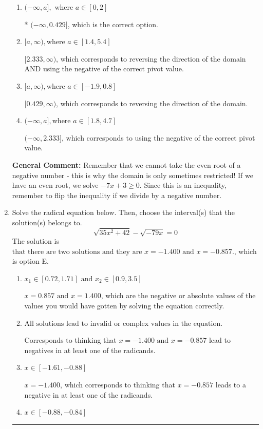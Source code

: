 \documentclass{extbook}[14pt]
\newcommand{\litem}[1]{\item #1

\rule{\textwidth}{0.4pt}}
\begin{document}
\begin{enumerate}
{\begin{enumerate}[label=\Alph*.]
This corresponds to the radical having an odd power, but the radical for this question is even.
\item \( (-\infty, a], \text{ where } a \in [0, 2] \)

* $(-\infty, 0.429]$, which is the correct option.
\item \( [a, \infty), \text{where } a \in [1.4, 5.4] \)

$[2.333, \infty)$, which corresponds to reversing the direction of the domain AND using the negative of the correct pivot value.
\item \( [a, \infty), \text{where } a \in [-1.9, 0.8] \)

 $[0.429, \infty)$, which corresponds to reversing the direction of the domain.
\item \( (-\infty, a], \text{where } a \in [1.8, 4.7] \)

$(-\infty, 2.333]$, which corresponds to using the negative of the correct pivot value.
\end{enumerate}

\textbf{General Comment:} Remember that we cannot take the even root of a negative number - this is why the domain is only sometimes restricted! If we have an even root, we solve $-7 x + 3 \geq 0$. Since this is an inequality, remember to flip the inequality if we divide by a negative number.
}
\litem{
Solve the radical equation below. Then, choose the interval(s) that the solution(s) belongs to.
\[ \sqrt{35 x^2 + 42} - \sqrt{-79 x} = 0 \]The solution is \( \text{that there are two solutions and they are } x = -1.400 \text{ and } x = -0.857. \), which is option E.\begin{enumerate}[label=\Alph*.]
\item \( x_1 \in [0.72, 1.71] \text{ and } x_2 \in [0.9,3.5] \)

$x = 0.857 \text{ and } x = 1.400$, which are the negative or absolute values of the values you would have gotten by solving the equation correctly.
\item \( \text{All solutions lead to invalid or complex values in the equation.} \)

Corresponds to thinking that $x = -1.400 \text{ and } x = -0.857$ lead to negatives in at least one of the radicands.
\item \( x \in [-1.61,-0.88] \)

$x = -1.400$, which corresponds to thinking that $x = -0.857$ leads to a negative in at least one of the radicands.
\item \( x \in [-0.88,-0.84] \)


\end{enumerate}}
\end{enumerate}
\end{document}
